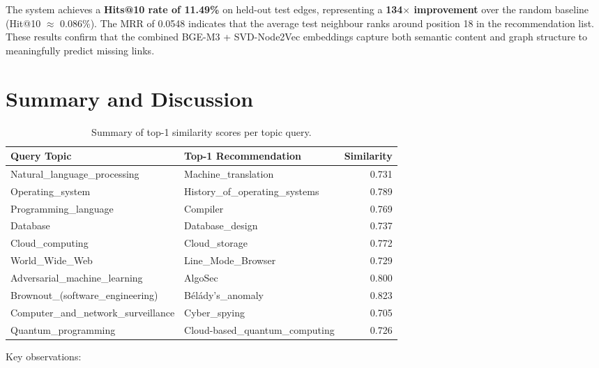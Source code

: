 \documentclass[12pt,a4paper]{article}
\begin{document}
The system achieves a \textbf{Hits@10 rate of 11.49\%} on held-out test edges,
representing a \textbf{134$\times$ improvement} over the random baseline
(Hit@10 $\approx$ 0.086\%). The MRR of 0.0548 indicates that
the average test neighbour ranks around position 18 in the recommendation list.
These results confirm that the combined BGE-M3 + SVD-Node2Vec embeddings capture
both semantic content and graph structure to meaningfully predict missing links.

\section{Summary and Discussion}

\begin{table}[H]
\centering
\caption{Summary of top-1 similarity scores per topic query.}
\label{tab:summary}
\begin{tabular}{llr}
\toprule
\textbf{Query Topic} & \textbf{Top-1 Recommendation} & \textbf{Similarity} \\
\midrule
Natural\_language\_processing & Machine\_translation & 0.731 \\
Operating\_system & History\_of\_operating\_systems & 0.789 \\
Programming\_language & Compiler & 0.769 \\
Database & Database\_design & 0.737 \\
Cloud\_computing & Cloud\_storage & 0.772 \\
World\_Wide\_Web & Line\_Mode\_Browser & 0.729 \\
Adversarial\_machine\_learning & AlgoSec & 0.800 \\
Brownout\_(software\_engineering) & Bélády's\_anomaly & 0.823 \\
Computer\_and\_network\_surveillance & Cyber\_spying & 0.705 \\
Quantum\_programming & Cloud-based\_quantum\_computing & 0.726 \\
\bottomrule
\end{tabular}
\end{table}

Key observations:
\end{document}
